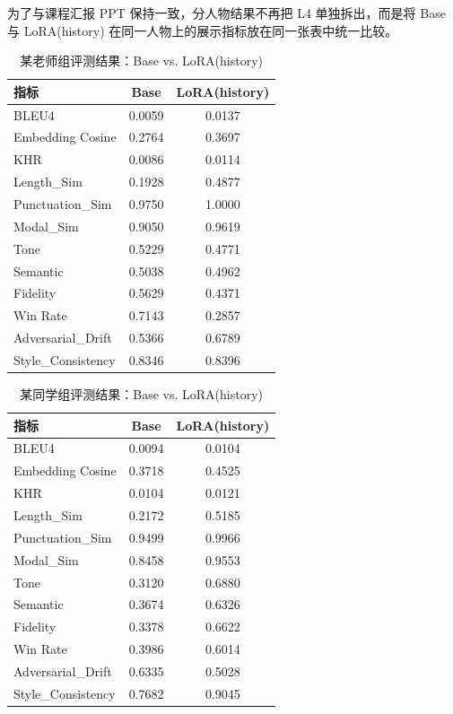 \documentclass[12pt,a4paper]{ctexart}
\begin{document}
为了与课程汇报 PPT 保持一致，分人物结果不再把 L4 单独拆出，而是将 Base 与 LoRA(history) 在同一人物上的展示指标放在同一张表中统一比较。

\begin{table}[H]
\centering
\caption{某老师组评测结果：Base vs. LoRA(history)}
\label{tab:xiao-result}
\begin{tabular}{lcc}
\toprule
指标 & Base & LoRA(history) \\
\midrule
BLEU4 & 0.0059 & 0.0137 \\
Embedding Cosine & 0.2764 & 0.3697 \\
KHR & 0.0086 & 0.0114 \\
Length\_Sim & 0.1928 & 0.4877 \\
Punctuation\_Sim & 0.9750 & 1.0000 \\
Modal\_Sim & 0.9050 & 0.9619 \\
Tone & 0.5229 & 0.4771 \\
Semantic & 0.5038 & 0.4962 \\
Fidelity & 0.5629 & 0.4371 \\
Win Rate & 0.7143 & 0.2857 \\
Adversarial\_Drift & 0.5366 & 0.6789 \\
Style\_Consistency & 0.8346 & 0.8396 \\
\bottomrule
\end{tabular}
\end{table}

\begin{table}[H]
\centering
\caption{某同学组评测结果：Base vs. LoRA(history)}
\label{tab:lixv-result}
\begin{tabular}{lcc}
\toprule
指标 & Base & LoRA(history) \\
\midrule
BLEU4 & 0.0094 & 0.0104 \\
Embedding Cosine & 0.3718 & 0.4525 \\
KHR & 0.0104 & 0.0121 \\
Length\_Sim & 0.2172 & 0.5185 \\
Punctuation\_Sim & 0.9499 & 0.9966 \\
Modal\_Sim & 0.8458 & 0.9553 \\
Tone & 0.3120 & 0.6880 \\
Semantic & 0.3674 & 0.6326 \\
Fidelity & 0.3378 & 0.6622 \\
Win Rate & 0.3986 & 0.6014 \\
Adversarial\_Drift & 0.6335 & 0.5028 \\
Style\_Consistency & 0.7682 & 0.9045 \\
\bottomrule
\end{tabular}
\end{table}
\end{document}

